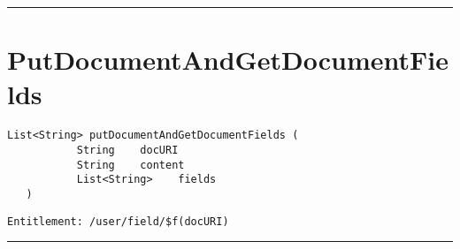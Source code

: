 \rule{12cm}{2pt}
\section{PutDocumentAndGetDocumentFields}
\label{Api:PutDocumentAndGetDocumentFields}
\begin{lstlisting}[style=nonumbers]
   List<String> putDocumentAndGetDocumentFields (
           String    docURI
           String    content
           List<String>    fields
   )
\end{lstlisting}
\begin{Verbatim}[formatcom=\color{Maroon}]
  Entitlement: /user/field/$f(docURI)
\end{Verbatim}



\rule{12cm}{2pt}
